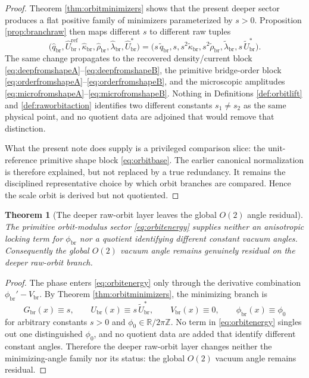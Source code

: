 \documentclass[11pt]{article}
\newcommand{\RespVacAmp}{U_{\mathrm{br}}}
\newcommand{\RespVacPhase}{\phi_{\mathrm{br}}}
\newcommand{\RespVacCarrier}{V_{\mathrm{br}}}
\newcommand{\RespRawReadout}{\widehat q_{\mathrm{br}}}
\newcommand{\RespRawRef}{\widehat U_{\mathrm{br}}^{\mathrm{ref}}}
\newcommand{\RespRawCov}{\widehat\kappa_{\mathrm{br}}}
\newcommand{\RespRawRelax}{\widehat\rho_{\mathrm{br}}}
\newcommand{\RespRawWell}{\widehat\lambda_{\mathrm{br}}}
\newcommand{\RespRawEq}{\widehat U_{\mathrm{br}}^{\ast}}
\newcommand{\RespShapeReadout}{\widetilde q_{\mathrm{br}}}
\newcommand{\RespShapeCov}{\widetilde\kappa_{\mathrm{br}}}
\newcommand{\RespShapeRelax}{\widetilde\rho_{\mathrm{br}}}
\newcommand{\RespShapeWell}{\widetilde\lambda_{\mathrm{br}}}
\newcommand{\RespShapeEq}{\widetilde U_{\mathrm{br}}^{\ast}}
\newcommand{\RespOrbitField}{G_{\mathrm{br}}}
\newtheorem{theorem}{Theorem}
\begin{document}
\begin{proof}
Theorem \ref{thm:orbitminimizers} shows that the present deeper sector produces a flat positive family of minimizers parameterized by \(s>0\). Proposition \ref{prop:branchraw} then maps different \(s\) to different raw tuples
\[
\bigl(\RespRawReadout,\RespRawRef,\RespRawCov,\RespRawRelax,\RespRawWell,\RespRawEq\bigr)
=
\bigl(s\,\RespShapeReadout,s,s^2\RespShapeCov,s^2\RespShapeRelax,\RespShapeWell,s\,\RespShapeEq\bigr).
\]
The same change propagates to the recovered density/current block \eqref{eq:deepfromshapeA}--\eqref{eq:deepfromshapeB}, the primitive bridge-order block \eqref{eq:orderfromshapeA}--\eqref{eq:orderfromshapeB}, and the microscopic amplitudes \eqref{eq:microfromshapeA}--\eqref{eq:microfromshapeB}. Nothing in Definitions \ref{def:orbitlift} and \ref{def:raworbitaction} identifies two different constants \(s_1\neq s_2\) as the same physical point, and no quotient data are adjoined that would remove that distinction.

What the present note does supply is a privileged comparison slice: the unit-reference primitive shape block \eqref{eq:orbitbase}. The earlier canonical normalization is therefore explained, but not replaced by a true redundancy. It remains the disciplined representative choice by which orbit branches are compared. Hence the scale orbit is derived but not quotiented.
\end{proof}

\begin{theorem}[The deeper raw-orbit layer leaves the global \(O(2)\) angle residual]
\label{thm:angleresidual}
The primitive orbit-modulus sector \eqref{eq:orbitenergy} supplies neither an anisotropic locking term for \(\RespVacPhase\) nor a quotient identifying different constant vacuum angles. Consequently the global \(O(2)\) vacuum angle remains genuinely residual on the deeper raw-orbit branch.
\end{theorem}

\begin{proof}
The phase enters \eqref{eq:orbitenergy} only through the derivative combination \(\RespVacPhase'-\RespVacCarrier\). By Theorem \ref{thm:orbitminimizers}, the minimizing branch is
\[
\RespOrbitField(x)\equiv s,
\qquad
\RespVacAmp(x)\equiv s\,\RespShapeEq,
\qquad
\RespVacCarrier(x)\equiv0,
\qquad
\RespVacPhase(x)\equiv\phi_0
\]
for arbitrary constants \(s>0\) and \(\phi_0\in\mathbb R/2\pi\mathbb Z\). No term in \eqref{eq:orbitenergy} singles out one distinguished \(\phi_0\), and no quotient data are added that identify different constant angles. Therefore the deeper raw-orbit layer changes neither the minimizing-angle family nor its status: the global \(O(2)\) vacuum angle remains residual.
\end{proof}
\end{document}
